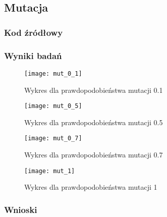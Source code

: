 \subsection{Mutacja}

\subsubsection{Kod źródłowy}



\subsubsection{Wyniki badań}

\begin{figure}[H]
	\centering
	\hspace*{-0.8in}
	\texttt{[image: mut\_0\_1]}
	\caption{Wykres dla prawdopodobieństwa mutacji 0.1}  
	\label{rys:mut_0.1} 
\end{figure}

\begin{figure}[H]
	\centering
	\hspace*{-0.8in}
	\texttt{[image: mut\_0\_5]}
	\caption{Wykres dla prawdopodobieństwa mutacji 0.5}  
	\label{rys:mut_0.5} 
\end{figure}

\begin{figure}[H]
	\centering
	\hspace*{-0.8in}
	\texttt{[image: mut\_0\_7]}
	\caption{Wykres dla prawdopodobieństwa mutacji 0.7}  
	\label{rys:mut_0.7} 
\end{figure}

\begin{figure}[H]
	\centering
	\hspace*{-0.8in}
	\texttt{[image: mut\_1]}
	\caption{Wykres dla prawdopodobieństwa mutacji 1}  
	\label{rys:mut_1} 
\end{figure}



\subsubsection{Wnioski}


